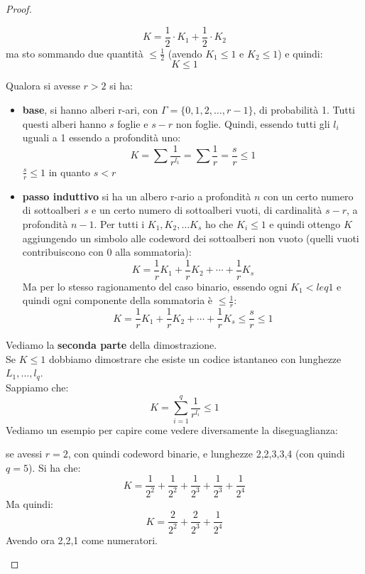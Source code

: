 \documentclass[a4paper,12pt, oneside]{book}
\begin{document}
\begin{proof}
\begin{itemize}
    \[K=\frac{1}{2}\cdot K_1+\frac{1}{2}\cdot K_2\]
    ma sto sommando due quantità $\leq \frac{1}{2}$ (avendo $K_1\leq 1$ e
    $K_2\leq 1$) e quindi: 
    \[K\leq 1\]
  \end{itemize}
  Qualora si avesse $r>2$ si ha:
  \begin{itemize}
    \item \textbf{base}, si hanno alberi r-ari, con
    $\Gamma=\{0,1,2,\ldots,r-1\}$, di probabilità 1. Tutti questi alberi hanno
    $s$ foglie e $s-r$ non foglie. Quindi, essendo tutti gli $l_i$ uguali a 1
    essendo a profondità uno:
    \[K=\sum \frac{1}{r^{l_1}}=\sum \frac{1}{r}=\frac{s}{r}\leq 1\]
    $\frac{s}{r}\leq 1$ in quanto $s<r$
    \item \textbf{passo induttivo} si ha un albero r-ario a profondità $n$ con
    un certo numero di sottoalberi $s$ e un certo numero di sottoalberi vuoti,
    di cardinalità $s-r$, a profondità $n-1$. Per tutti i $K_1,K_2,\ldots K_s$
    ho che $K_i\leq 1$ e quindi ottengo $K$ aggiungendo un simbolo alle codeword 
    dei sottoalberi non vuoto (quelli vuoti contribuiscono con 0 alla
    sommatoria): 
    \[K=\frac{1}{r}K_1+\frac{1}{r}K_2+\cdots+\frac{1}{r}K_s\]
    Ma per lo stesso ragionamento del caso binario, essendo ogni $K_1<leq 1$ e
    quindi ogni componente della sommatoria è $\leq \frac{1}{r}$:
    \[K=\frac{1}{r}K_1+\frac{1}{r}K_2+\cdots+\frac{1}{r}K_s\leq \frac{s}{r}\leq
      1\] 
  \end{itemize}
  Vediamo la \textbf{seconda parte} della dimostrazione.\\
  Se $K\leq 1$ dobbiamo dimostrare che esiste un codice istantaneo con lunghezze
  $L_1,\ldots, l_q$.\\
  Sappiamo che:
  \[K=\sum_{i=1}^q\frac{1}{r^{l_i}}\leq 1\]
  Vediamo un esempio per capire come vedere diversamente la diseguaglianza:
  \begin{esempio}
    se avessi $r=2$, con quindi codeword binarie, e lunghezze 2,2,3,3,4 (con
    quindi $q=5$). Si ha che: 
    \[K=\frac{1}{2^2}+\frac{1}{2^2}+\frac{1}{2^3}+\frac{1}{2^3}+\frac{1}{2^4}\]
    Ma quindi:
    \[K=\frac{2}{2^2}+\frac{2}{2^3}+\frac{1}{2^4}\]
    Avendo ora 2,2,1 come numeratori.
  \end{esempio}


\end{proof}
\end{document}
